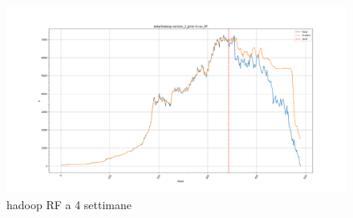 \documentclass[%
    corpo=12pt,
    twoside,
    oldstyle,
    autoretitolo,
    greek,
    evenboxes,
]{toptesi}
\begin{document}
\begin{figure}[!ht]
  \includegraphics[width=\linewidth]{figure/hadoop_rf_4w.png}
  \caption{hadoop RF a 4 settimane}
  \label{fig:hadoop_rf_4w}
\end{figure}
\end{document}
